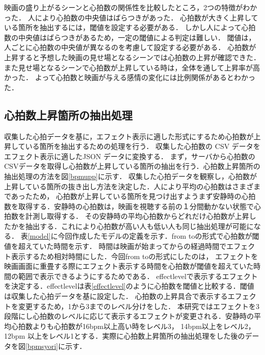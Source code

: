 映画の盛り上がるシーンと心拍数の関係性を比較したところ，2つの特徴がわかった．
人により心拍数の中央値はばらつきがあった．
心拍数が大きく上昇している箇所を抽出するには，閾値を設定する必要がある．
しかし人によって心拍数の中央値はばらつきがあるため，一定の閾値による判定は難しい．
閾値は，人ごとに心拍数の中央値が異なるのを考慮して設定する必要がある．
心拍数が上昇すると予想した映画の見せ場となるシーンでは心拍数の上昇が確認できた．
また見せ場となるシーンで心拍数が上昇している時は，全体を通して上昇率が高かった．
よって心拍数と映画が与える感情の変化には比例関係があるとわかった．



\subsection{心拍数上昇箇所の抽出処理}
収集した心拍データを基に，エフェクト表示に適した形式にするため心拍数が上昇している箇所を抽出するための処理を行う．
収集した心拍数の CSV データをエフェクト表示に適したJSON データに変換する．
まず，サーバから心拍数のCSVデータを取得し心拍数が上昇している箇所の抽出を行う．心拍数上昇箇所の抽出処理の方法を図\ref{bpmupp}に示す．
収集した心拍データを観察し，心拍数が上昇している箇所の抜き出し方法を決定した．人により平均の心拍数はさまざまであったため，
心拍数が上昇している箇所を見つけ出すようまず安静時の心拍数を取得する．安静時の心拍数は，映画を視聴する前の１分間動かない状態で心拍数を計測し取得する．
その安静時の平均心拍数からどれだけ心拍数が上昇したかを抽出する．これにより心拍数が高い人も低い人も同じ抽出処理が可能になる．
表\ref{model}に今回作成したモデルの定義を示す．from toの形式で心拍数が閾値を超えていた時間を示す．
時間は映画が始まってからの経過時間でエフェクト表示するため相対時間にした．今回from toの形式にしたのは，
エフェクトを映画画面に重畳する際にエフェクト表示する時間を心拍数が閾値を超えていた時間の範囲で表示できるようにするためである．
effectlevelで表示するエフェクトを決定する．effectlevelは表\ref{effectlevel}のように心拍数を閾値と比較する．閾値は収集した心拍データを基に設定した．
心拍数の上昇具合で表示するエフェクトを変更するため，1から3までのレベル分けをした．
本研究ではエフェクトを3段階にし心拍数のレベルに応じて表示するエフェクトが変更される．安静時の平均心拍数よりも心拍数が16bpm以上高い時をレベル3，
14bpm以上をレベル2，12bpm 以上をレベル1とする．実際に心拍数上昇箇所の抽出処理をした後のデータを図\ref{bpmsyori}に示す．


